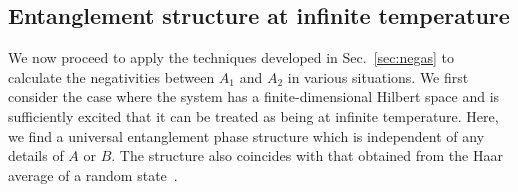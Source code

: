 \documentclass[a4paper,11pt]{article}
\newcommand\lam{\lambda}
\newcommand\sZ{{\mathcal Z}}
\begin{document}


\iffalse
The plan for the rest of the section is as follows. In next subsection we apply the approximation developed in Sec.~\ref{sec:negas} to find the entanglement phase diagram at infinite temperature, and finite temperature (canonical and microcanonical ensembles). We will also compute the corresponding mutual information between $A_1$ and $A_2$ which can be obtained by directly applying the equilibrium approximation for Renyi entropies reviewed in Sec.~\ref{sec:revea}. 
\fi 





\subsection{Entanglement structure at infinite temperature} \label{sec:inft} 



We now proceed to apply the techniques developed in Sec.~\ref{sec:negas} to calculate the negativities between $A_1$ and $A_2$ in various situations. We first consider the case where the system has a finite-dimensional Hilbert space 
and is sufficiently excited that it can be treated as being at infinite temperature. 
Here, we find a universal entanglement phase structure which is independent of any details of $A$ or $B$. 
The structure also coincides with that obtained from the Haar average of a random state~\cite{2021PRXQ....2c0347S}. 
\end{document}
